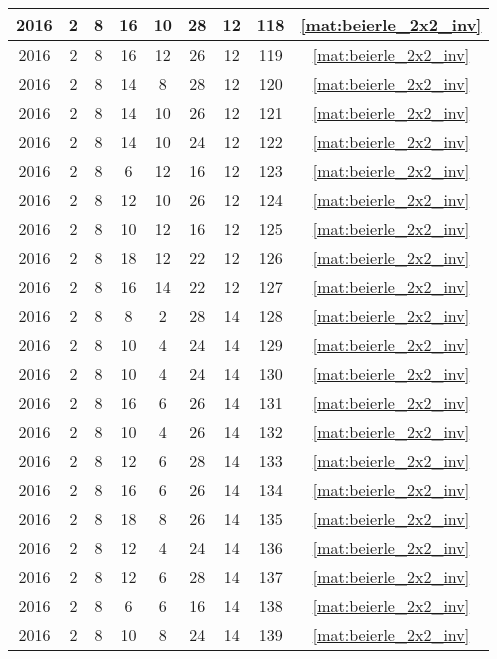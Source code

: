 \begin{longtable}{|c|c|c|c|c|c|c|c|c|}
2016 & 2 & 8 & 16 & 10 & 28 & 12 & 118 & \eqref{mat:beierle_2x2_inv} \\ \hline 
2016 & 2 & 8 & 16 & 12 & 26 & 12 & 119 & \eqref{mat:beierle_2x2_inv} \\ \hline 
2016 & 2 & 8 & 14 & 8 & 28 & 12 & 120 & \eqref{mat:beierle_2x2_inv} \\ \hline 
2016 & 2 & 8 & 14 & 10 & 26 & 12 & 121 & \eqref{mat:beierle_2x2_inv} \\ \hline 
2016 & 2 & 8 & 14 & 10 & 24 & 12 & 122 & \eqref{mat:beierle_2x2_inv} \\ \hline 
2016 & 2 & 8 & 6 & 12 & 16 & 12 & 123 & \eqref{mat:beierle_2x2_inv} \\ \hline 
2016 & 2 & 8 & 12 & 10 & 26 & 12 & 124 & \eqref{mat:beierle_2x2_inv} \\ \hline 
2016 & 2 & 8 & 10 & 12 & 16 & 12 & 125 & \eqref{mat:beierle_2x2_inv} \\ \hline 
2016 & 2 & 8 & 18 & 12 & 22 & 12 & 126 & \eqref{mat:beierle_2x2_inv} \\ \hline 
2016 & 2 & 8 & 16 & 14 & 22 & 12 & 127 & \eqref{mat:beierle_2x2_inv} \\ \hline 
2016 & 2 & 8 & 8 & 2 & 28 & 14 & 128 & \eqref{mat:beierle_2x2_inv} \\ \hline 
2016 & 2 & 8 & 10 & 4 & 24 & 14 & 129 & \eqref{mat:beierle_2x2_inv} \\ \hline 
2016 & 2 & 8 & 10 & 4 & 24 & 14 & 130 & \eqref{mat:beierle_2x2_inv} \\ \hline 
2016 & 2 & 8 & 16 & 6 & 26 & 14 & 131 & \eqref{mat:beierle_2x2_inv} \\ \hline 
2016 & 2 & 8 & 10 & 4 & 26 & 14 & 132 & \eqref{mat:beierle_2x2_inv} \\ \hline 
2016 & 2 & 8 & 12 & 6 & 28 & 14 & 133 & \eqref{mat:beierle_2x2_inv} \\ \hline 
2016 & 2 & 8 & 16 & 6 & 26 & 14 & 134 & \eqref{mat:beierle_2x2_inv} \\ \hline 
2016 & 2 & 8 & 18 & 8 & 26 & 14 & 135 & \eqref{mat:beierle_2x2_inv} \\ \hline 
2016 & 2 & 8 & 12 & 4 & 24 & 14 & 136 & \eqref{mat:beierle_2x2_inv} \\ \hline 
2016 & 2 & 8 & 12 & 6 & 28 & 14 & 137 & \eqref{mat:beierle_2x2_inv} \\ \hline 
2016 & 2 & 8 & 6 & 6 & 16 & 14 & 138 & \eqref{mat:beierle_2x2_inv} \\ \hline 
2016 & 2 & 8 & 10 & 8 & 24 & 14 & 139 & \eqref{mat:beierle_2x2_inv} \\ \hline 

\end{longtable}
